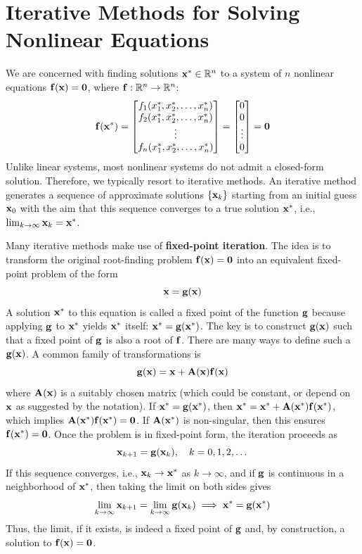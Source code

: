 \section{Iterative Methods for Solving Nonlinear Equations}

We are concerned with finding solutions $\mathbf{x}^* \in \mathbb{R}^n$ to a system of $n$ nonlinear equations $\mathbf{f}(\mathbf{x}) = \mathbf{0}$, where $\mathbf{f}: \mathbb{R}^n \to \mathbb{R}^n$:
\[
    \mathbf{f}(\mathbf{x}^*) = \begin{bmatrix} f_1(x_1^*, x_2^*, \dots, x_n^*) \\ f_2(x_1^*, x_2^*, \dots, x_n^*) \\ \vdots \\ f_n(x_1^*, x_2^*, \dots, x_n^*) \end{bmatrix} = \begin{bmatrix} 0 \\ 0 \\ \vdots \\ 0 \end{bmatrix} = \mathbf{0}
\]
Unlike linear systems, most nonlinear systems do not admit a closed-form solution. Therefore, we typically resort to iterative methods. An iterative method generates a sequence of approximate solutions $\{\mathbf{x}_k\}$ starting from an initial guess $\mathbf{x}_0$ with the aim that this sequence converges to a true solution $\mathbf{x}^*$, i.e., $\lim_{k\to\infty} \mathbf{x}_k = \mathbf{x}^*$.

Many iterative methods make use of  \textbf{fixed-point iteration}. The idea is to transform the original root-finding problem $\mathbf{f}(\mathbf{x}) = \mathbf{0}$ into an equivalent fixed-point problem of the form
\[
    \mathbf{x} = \mathbf{g}(\mathbf{x})
\]
A solution $\mathbf{x}^*$ to this equation is called a fixed point of the function $\mathbf{g}$ because applying $\mathbf{g}$ to $\mathbf{x}^*$ yields $\mathbf{x}^*$ itself: $\mathbf{x}^* = \mathbf{g}(\mathbf{x}^*)$. The key is to construct $\mathbf{g}(\mathbf{x})$ such that a fixed point of $\mathbf{g}$ is also a root of $\mathbf{f}$. There are many ways to define such a $\mathbf{g}(\mathbf{x})$. A common family of transformations is
\[
    \mathbf{g}(\mathbf{x}) = \mathbf{x} + \mathbf{A}(\mathbf{x})\mathbf{f}(\mathbf{x})
\]
where $\mathbf{A}(\mathbf{x})$ is a suitably chosen matrix (which could be constant, or depend on $\mathbf{x}$ as suggested by the notation). If $\mathbf{x}^* = \mathbf{g}(\mathbf{x}^*)$, then $\mathbf{x}^* = \mathbf{x}^* + \mathbf{A}(\mathbf{x}^*)\mathbf{f}(\mathbf{x}^*)$, which implies $\mathbf{A}(\mathbf{x}^*)\mathbf{f}(\mathbf{x}^*) = \mathbf{0}$. If $\mathbf{A}(\mathbf{x}^*)$ is non-singular, then this ensures $\mathbf{f}(\mathbf{x}^*) = \mathbf{0}$. Once the problem is in fixed-point form, the iteration proceeds as
\[
    \mathbf{x}_{k+1} = \mathbf{g}(\mathbf{x}_k), \quad k = 0, 1, 2, \dots
\]
If this sequence converges, i.e., $\mathbf{x}_k \to \mathbf{x}^*$ as $k \to \infty$, and if $\mathbf{g}$ is continuous in a neighborhood of $\mathbf{x}^*$, then taking the limit on both sides gives
\[ 
\lim_{k\to\infty} \mathbf{x}_{k+1} = \lim_{k\to\infty} \mathbf{g}(\mathbf{x}_k) \implies \mathbf{x}^* = \mathbf{g}(\mathbf{x}^*) 
\]
Thus, the limit, if it exists, is indeed a fixed point of $\mathbf{g}$ and, by construction, a solution to $\mathbf{f}(\mathbf{x}) = \mathbf{0}$.


